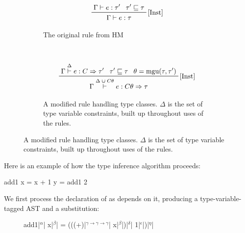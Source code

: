 \documentclass[dissertation.tex]{subfiles}
\begin{document}
{{{            \begin{figure}[h]
            \centering
            \begin{subfigure}[t]{0.3\textwidth}
            \begin{displaymath}
            \prftree[r]{\([\text{Inst}]\)}
            {\prfassumption{\Gamma\vdash e : \tau'}}
            {\prfassumption{\tau' \sqsubseteq \tau}}
            {\Gamma\vdash e : \tau}
            \end{displaymath}
            \caption*{The original rule from HM}
            \end{subfigure}
            ~
            \begin{subfigure}[t]{0.6\textwidth}
            \begin{displaymath}
            \prftree[r]{\([\text{Inst}]\)}
            {\prfassumption{\Gamma\stackrel{\Delta}{\vdash} e : C\Rightarrow\tau'}}
            {\prfassumption{\tau' \sqsubseteq \tau}}
            {\prfassumption{\theta = \text{mgu}(\tau, \tau')}}
            {\Gamma\stackrel{\Delta\;\cup\;C\theta}{\vdash} e : C\theta\Rightarrow\tau}
            \end{displaymath}
            \caption*{A modified rule handling type classes. \(\Delta\) is the set of type variable constraints, built up throughout uses of the rules.}
            \end{subfigure}
            \end{figure}


            Here is an example of how the type inference algorithm proceeds:

            \begin{haskellfigure}
            add1 x = x + 1
            y = add1 2
            \end{haskellfigure}

            We first process the declaration of  as  depends on it, producing a
            type-variable-tagged AST and a substitution:

            \begin{figure}[H]
                \centering
                \begin{haskellfigure}
                add1|\(^\alpha\)| x|\(^\beta\)| = (((+)|\(^{\gamma \rightarrow \gamma \rightarrow \gamma}\)| x|\(^\beta\)|)|\(^\delta\)| 1|\(^\epsilon\)|)|\(^\eta\)|
                \end{haskellfigure}
            \end{figure}

}}}
\end{document}

